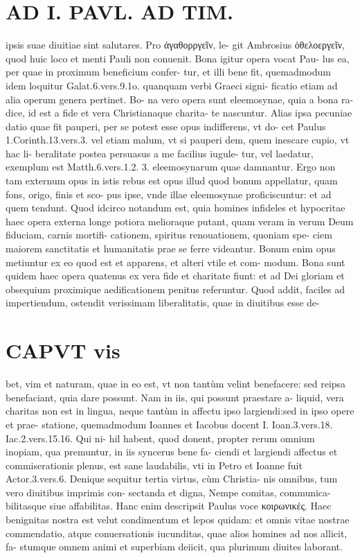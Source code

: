 \documentclass{article}
\begin{document}
\begin{pages}
\section*{AD I. PAVL. AD TIM. }
\marginpar{[ p.JUa. ]}\pstart ipsis suae diuitiae sint salutares. Pro ἀγαθορργεῖν, le- git Ambrosius ὀθελοεργεῖν, quod huic loco et menti Pauli non conuenit. Bona igitur opera vocat Pau- lus ea, per quae in proximum beneficium confer- tur, et illi bene fit, quemadmodum idem loquitur Galat.6.vers.9.1o. quanquam verbi Graeci signi- ficatio etiam ad alia operum genera pertinet. Bo- na vero opera sunt eleemosynae, quia a bona ra- dice, id est a fide et vera Christianaque charita- te nascuntur. Alias ipsa pecuniae datio quae fit pauperi, per se potest esse opus indifferens, vt do- cet Paulus 1.Corinth.13.vers.3. vel etiam malum, vt si pauperi dem, quem inescare cupio, vt hac li- beralitate postea persuasus a me facilius iugule- tur, vel laedatur, exemplum est Matth.6.vers.1.2. 3. eleemosynarum quae damnantur. Ergo non tam externum opus in istis rebus est opus illud quod bonum appellatur, quam fons, origo, finis et sco- pus ipse, vnde illae eleemosynae proficiscuntur: et ad quem tendunt. Quod idcirco notandum est, quia homines infideles et hypocritae haec opera externa longe potiora melioraque putant, quam veram in verum Deum fiduciam, carnis mortifi- cationem, spiritus renouationem, quoniam spe- ciem maiorem sanctitatis et humanitatis prae se ferre videantur. Bonum enim opus metiuntur ex eo quod est et apparens, et alteri vtile et com- modum. Bona sunt quidem haec opera quatenus ex vera fide et charitate fiunt: et ad Dei gloriam et obsequium proximique aedificationem penitus referuntur.  \pend\pstart Quod addit, faciles ad impertiendum, ostendit verissimam liberalitatis, quae in diuitibus esse de-  \pend
\section*{CAPVT vis }
\marginpar{[ p.2 ]}\pstart bet, vim et naturam, quae in eo est, vt non tantùm velint benefacere: sed reipsa benefaciant, quia dare possunt. Nam in iis, qui possunt praestare a- liquid, vera charitas non est in lingua, neque  tantùm in affectu ipso largiendi:sed in ipso opere et prae- statione, quemadmodum Ioannes et Iacobus docent I. Ioan.3.vers.18. Iac.2.vers.15.16. Qui ni- hil habent, quod donent, propter rerum omnium inopiam, qua premuntur, in iis syncerus bene fa- ciendi et largiendi affectus et commiserationis plenus, est sane laudabilis, vti in Petro et Ioanne fuit Actor.3.vers.6.  \pend\pstart Denique sequitur tertia virtus, cùm Christia- nis omnibus, tum vero diuitibus imprimis con- sectanda et digna, Nempe comitas, communica- bilitasque siue affabilitas. Hanc enim descripsit Paulus voce κοιρωνικές. Haec benignitas nostra est velut condimentum et lepos quidam: et omnis vitae nostrae commendatio, atque conuersationis iucunditas, quae alios homines ad nos allicit, fa- stumque omnem animi et superbiam deiicit, qua plurimum diuites laborant.  \pend
{}
{}

\end{pages}
\end{document}
